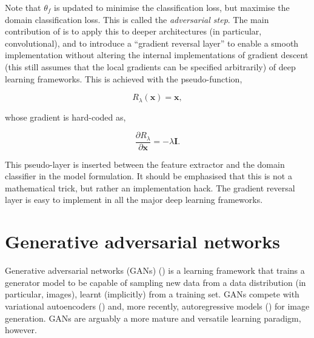 Note that $\theta_f$ is updated to minimise the classification loss, but maximise the domain classification loss. This is called the \emph{adversarial step}. The main contribution of \cite{ganin2014unsupervised} is to apply this to deeper architectures (in particular, convolutional), and to introduce a ``gradient reversal layer'' to enable a smooth implementation without altering the internal implementations of gradient descent (this still assumes that the local gradients can be specified arbitrarily) of deep learning frameworks. This is achieved with the pseudo-function,

\begin{equation}
R_\lambda(\mathbf{x}) = \mathbf{x},
\end{equation}

whose gradient is hard-coded as,

\begin{equation}
\frac{\partial R_\lambda}{\partial\mathbf{x}} = -\lambda\mathbf{I}.
\end{equation}

This pseudo-layer is inserted between the feature extractor and the domain classifier in the model formulation. It should be emphasised that this is not a mathematical trick, but rather an implementation hack. The gradient reversal layer is easy to implement in all the major deep learning frameworks.

\section{Generative adversarial networks}
\label{sec:gans_definition}
Generative adversarial networks (GANs) (\cite{goodfellow2014generative}) is a learning framework that trains a generator model to be capable of sampling new data from a data distribution (in particular, images), learnt (implicitly) from a training set. GANs compete with variational autoencoders (\cite{kingma2013auto}) and, more recently, autoregressive models (\cite{oord2016pixel}) for image generation. GANs are arguably a more mature and versatile learning paradigm, however.

